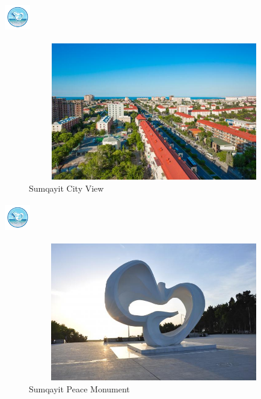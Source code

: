 \documentclass[hyperref={pdfpagemode=FullScreen}]{beamer}
\begin{document}
\begin{frame}{\includegraphics[width=1.1cm, height=1.3cm]{img/sum04.png}}
    \begin{figure}
        \includegraphics[width=11cm, height=6cm]{img/sum01.jpg}
        \caption{Sumqayit City View} 
    \end{figure}
\end{frame}

\begin{frame}{\includegraphics[width=1.1cm, height=1.3cm]{img/sum04.png}}
    \begin{figure}
      \includegraphics[width=11cm, height=6cm]{img/sum02.jpg}
        \caption{Sumqayit Peace Monument} 
    \end{figure}
\end{frame}
\end{document}
